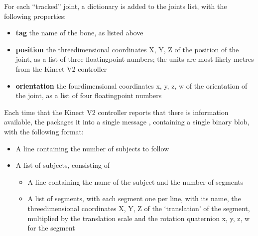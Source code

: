 For each ``tracked'' joint, a dictionary is added to the joints list, with the following
properties:
\begin{itemize}
\item\textbf{tag} \longDash{} the name of the bone, as listed above
\item\exSp\textbf{position} \longDash{} the three\longDash{}dimensional coordinates
\openSq{}X, Y, Z\closeSq{} of the position of the joint, as a list of three
floating\longDash{}point numbers; the units are most likely metres from the Kinect V2
controller
\item\exSp\textbf{orientation} \longDash{} the four\longDash{}dimensional coordinates
\openSq{}x, y, z, w\closeSq{} of the orientation of the joint, as a list of four
floating\longDash{}point numbers
\end{itemize}
\primaryEnd
{}
Each time that the Kinect V2 controller reports that there is information
available, the  packages it into a single message
\openSq{}\closeSq, containing a single binary blob, with the following
format:
\begin{itemize}
\item A line containing the number of subjects to follow
\item\exSp{}A list of subjects, consisting of
\begin{itemize}
\item A line containing the name of the subject and the number of segments
\item\exSp{}A list of segments, with each segment one per line, with its name, the
three\longDash{}dimensional coordinates \openSq{}X, Y, Z\closeSq{} of the `translation'
of the segment, multiplied by the translation scale and the rotation quaternion
\openSq{}x, y, z, w\closeSq{} for the segment
\end{itemize}
\end{itemize}
\primaryEnd{}
